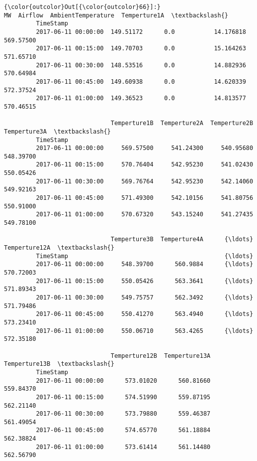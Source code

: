 \documentclass[11pt]{article}
\begin{document}
\begin{Verbatim}[commandchars=\\\{\}]
{\color{outcolor}Out[{\color{outcolor}66}]:}                             MW  Airflow  AmbientTemperature  Temperture1A  \textbackslash{}
         TimeStamp                                                                   
         2017-06-11 00:00:00  149.51172      0.0           14.176818     569.57500   
         2017-06-11 00:15:00  149.70703      0.0           15.164263     571.65710   
         2017-06-11 00:30:00  148.53516      0.0           14.882936     570.64984   
         2017-06-11 00:45:00  149.60938      0.0           14.620339     572.37524   
         2017-06-11 01:00:00  149.36523      0.0           14.813577     570.46515   
         
                              Temperture1B  Temperture2A  Temperture2B  Temperture3A  \textbackslash{}
         TimeStamp                                                                     
         2017-06-11 00:00:00     569.57500     541.24300     540.95680     548.39700   
         2017-06-11 00:15:00     570.76404     542.95230     541.02430     550.05426   
         2017-06-11 00:30:00     569.76764     542.95230     542.14060     549.92163   
         2017-06-11 00:45:00     571.49300     542.10156     541.80756     550.91000   
         2017-06-11 01:00:00     570.67320     543.15240     541.27435     549.78100   
         
                              Temperture3B  Temperture4A      {\ldots}        Temperture12A  \textbackslash{}
         TimeStamp                                            {\ldots}                        
         2017-06-11 00:00:00     548.39700      560.9884      {\ldots}            570.72003   
         2017-06-11 00:15:00     550.05426      563.3641      {\ldots}            571.89343   
         2017-06-11 00:30:00     549.75757      562.3492      {\ldots}            571.79486   
         2017-06-11 00:45:00     550.41270      563.4940      {\ldots}            573.23410   
         2017-06-11 01:00:00     550.06710      563.4265      {\ldots}            572.35180   
         
                              Temperture12B  Temperture13A  Temperture13B  \textbackslash{}
         TimeStamp                                                          
         2017-06-11 00:00:00      573.01020      560.81660      559.84370   
         2017-06-11 00:15:00      574.51990      559.87195      562.21140   
         2017-06-11 00:30:00      573.79880      559.46387      561.49054   
         2017-06-11 00:45:00      574.65770      561.18884      562.38824   
         2017-06-11 01:00:00      573.61414      561.14480      562.56790   
         

\end{Verbatim}
\end{document}
